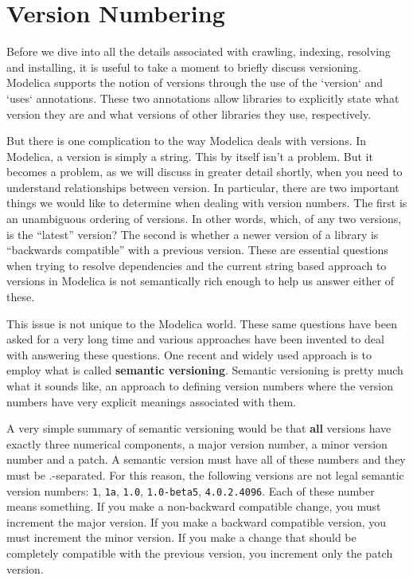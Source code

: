 \documentclass[11pt,a4paper,twocolumn]{article}
\newcommand{\code}[1]{\texttt{#1}} %
\begin{document}
\section{Version Numbering}
\label{sec:numbers}

Before we dive into all the details associated with crawling,
indexing, resolving and installing, it is useful to take a moment to
briefly discuss versioning.  Modelica supports the notion of versions
through the use of the `version` and `uses` annotations.  These two
annotations allow libraries to explicitly state what version they are
and what versions of other libraries they use, respectively.

But there is one complication to the way Modelica deals with versions.
In Modelica, a version is simply a string.  This by itself isn't a
problem.  But it becomes a problem, as we will discuss in greater
detail shortly, when you need to understand relationships between
version.  In particular, there are two important things we would like
to determine when dealing with version numbers.  The first is an
unambiguous ordering of versions.  In other words, which, of any two
versions, is the ``latest'' version?  The second is whether a newer
version of a library is ``backwards compatible'' with a previous
version.  These are essential questions when trying to resolve
dependencies and the current string based approach to versions in
Modelica is not semantically rich enough to help us answer either of
these.

This issue is not unique to the Modelica world.  These same questions
have been asked for a very long time and various approaches have been
invented to deal with answering these questions.  One recent and
widely used approach is to employ what is called \textbf{semantic
  versioning}\parencite{semver}.  Semantic versioning is pretty much what
it sounds like, an approach to defining version numbers where the
version numbers have very explicit meanings associated with them.

A very simple summary of semantic versioning would be that \textbf{all}
versions have exactly three numerical components, a major version
number, a minor version number and a patch.  A semantic version must
have all of these numbers and they must be .-separated.  For this
reason, the following versions are not legal semantic version numbers:
\code{1}, \code{1a}, \code{1.0}, \code{1.0-beta5}, \code{4.0.2.4096}.
Each of these number means something.  If you make a non-backward
compatible change, you must increment the major version.  If you make
a backward compatible version, you must increment the minor version.
If you make a change that should be completely compatible with the
previous version, you increment only the patch version.
\end{document}
